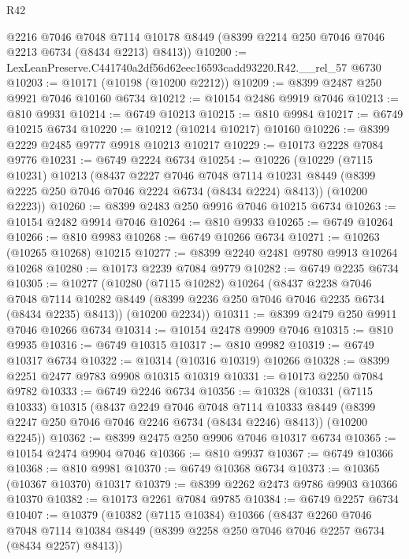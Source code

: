 \begin{lexlean}{R42}
\begin{coremodule}
{      @2216
      @7046
      @7048
      @7114
      @10178
      @8449
      (@8399 @2214 @250 @7046 @7046 @2213 @6734 (@8434 @2213) @8413))
@10200 := LexLeanPreserve.C441740a2df56d62eec16593cadd93220.R42.__rel_57 @6730
@10203 := @10171 (@10198 (@10200 @2212))
@10209 := @8399 @2487 @250 @9921 @7046 @10160 @6734
@10212 := @10154 @2486 @9919 @7046
@10213 := @810 @9931
@10214 := @6749 @10213
@10215 := @810 @9984
@10217 := @6749 @10215 @6734
@10220 := @10212 (@10214 @10217) @10160
@10226 := @8399 @2229 @2485 @9777 @9918 @10213 @10217
@10229 := @10173 @2228 @7084 @9776
@10231 := @6749 @2224 @6734
@10254 := @10226
    (@10229
      (@7115 @10231)
      @10213
      (@8437
        @2227
        @7046
        @7048
        @7114
        @10231
        @8449
        (@8399 @2225 @250 @7046 @7046 @2224 @6734 (@8434 @2224) @8413))
      (@10200 @2223))
@10260 := @8399 @2483 @250 @9916 @7046 @10215 @6734
@10263 := @10154 @2482 @9914 @7046
@10264 := @810 @9933
@10265 := @6749 @10264
@10266 := @810 @9983
@10268 := @6749 @10266 @6734
@10271 := @10263 (@10265 @10268) @10215
@10277 := @8399 @2240 @2481 @9780 @9913 @10264 @10268
@10280 := @10173 @2239 @7084 @9779
@10282 := @6749 @2235 @6734
@10305 := @10277
    (@10280
      (@7115 @10282)
      @10264
      (@8437
        @2238
        @7046
        @7048
        @7114
        @10282
        @8449
        (@8399 @2236 @250 @7046 @7046 @2235 @6734 (@8434 @2235) @8413))
      (@10200 @2234))
@10311 := @8399 @2479 @250 @9911 @7046 @10266 @6734
@10314 := @10154 @2478 @9909 @7046
@10315 := @810 @9935
@10316 := @6749 @10315
@10317 := @810 @9982
@10319 := @6749 @10317 @6734
@10322 := @10314 (@10316 @10319) @10266
@10328 := @8399 @2251 @2477 @9783 @9908 @10315 @10319
@10331 := @10173 @2250 @7084 @9782
@10333 := @6749 @2246 @6734
@10356 := @10328
    (@10331
      (@7115 @10333)
      @10315
      (@8437
        @2249
        @7046
        @7048
        @7114
        @10333
        @8449
        (@8399 @2247 @250 @7046 @7046 @2246 @6734 (@8434 @2246) @8413))
      (@10200 @2245))
@10362 := @8399 @2475 @250 @9906 @7046 @10317 @6734
@10365 := @10154 @2474 @9904 @7046
@10366 := @810 @9937
@10367 := @6749 @10366
@10368 := @810 @9981
@10370 := @6749 @10368 @6734
@10373 := @10365 (@10367 @10370) @10317
@10379 := @8399 @2262 @2473 @9786 @9903 @10366 @10370
@10382 := @10173 @2261 @7084 @9785
@10384 := @6749 @2257 @6734
@10407 := @10379
    (@10382
      (@7115 @10384)
      @10366
      (@8437
        @2260
        @7046
        @7048
        @7114
        @10384
        @8449
        (@8399 @2258 @250 @7046 @7046 @2257 @6734 (@8434 @2257) @8413))
}
\end{coremodule}
\end{lexlean}
